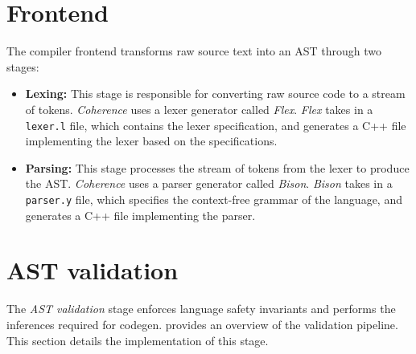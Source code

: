 \section{Frontend} \label{sec:frontend}
The compiler frontend transforms raw source text into an AST through two stages:
\begin{itemize}
  \item \textbf{Lexing:} This stage is responsible for converting raw source code to a stream of tokens. \textit{Coherence} uses a lexer generator called \textit{Flex}\cite{flex}. \textit{Flex} takes in a \texttt{lexer.l} file, which contains the lexer specification, and generates a C++ file implementing the lexer based on the specifications.
  \item \textbf{Parsing:} This stage processes the stream of tokens from the lexer to produce the AST. \textit{Coherence} uses a parser generator called \textit{Bison}\cite{bison}. \textit{Bison} takes in a \texttt{parser.y} file, which specifies the context-free grammar of the language, and generates a C++ file implementing the parser.
\end{itemize}

\section{AST validation} \label{sec:ast-validation}
The \textit{AST validation} stage enforces language safety invariants and performs the inferences required for codegen.  provides an overview of the validation pipeline. This section details the implementation of this stage.

